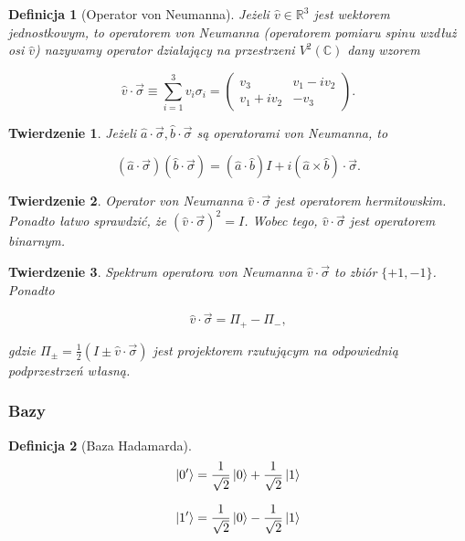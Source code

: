 \documentclass[a4paper,12pt]{article}
\newtheorem{definition}{Definicja}
\newtheorem{theorem}{Twierdzenie}
\begin{document}
\begin{definition}[Operator von Neumanna]
    Jeżeli $\hat{v} \in \mathbb{R} ^ 3$ jest wektorem jednostkowym, to operatorem von Neumanna (operatorem pomiaru spinu wzdłuż osi $\hat{v}$) nazywamy operator działający na przestrzeni $V ^ {2} (\mathbb{C})$ dany wzorem

    $$
        \hat{v} \cdot \vec{\sigma} \equiv \sum\limits_{i = 1} ^ {3} v_{i} \sigma_{i} =
        \begin{pmatrix}
            v_3 & v_{1} - i v_{2} \\
            v_{1} + i v_{2} & -v_3
        \end{pmatrix}.
    $$
\end{definition}

\begin{theorem}
    Jeżeli $\hat{a} \cdot \vec{\sigma}, \hat{b} \cdot \vec{\sigma}$ są operatorami von Neumanna, to

    $$
        (\hat{a} \cdot \vec{\sigma}) (\hat{b} \cdot \vec{\sigma}) = \left(\hat{a} \cdot \hat{b} \right) I + i \left(\hat{a} \times \hat{b}\right) \cdot \vec{\sigma}.
    $$
\end{theorem}

\begin{theorem}
    Operator von Neumanna $\hat{v} \cdot \vec{\sigma}$ jest operatorem hermitowskim. Ponadto łatwo sprawdzić, że $\left(\hat{v} \cdot \vec{\sigma}\right) ^ 2 = I$. Wobec tego, $\hat{v} \cdot \vec{\sigma}$ jest operatorem binarnym.
\end{theorem}

\begin{theorem}
    Spektrum operatora von Neumanna $\hat{v} \cdot \vec{\sigma}$ to zbiór $\{+1, -1\}$. Ponadto

    $$
    \hat{v} \cdot \vec{\sigma} = \Pi_{+} - \Pi_{-},
    $$

    gdzie $\Pi_{\pm} = \frac{1}{2} (I \pm \hat{v} \cdot \vec{\sigma})$ jest projektorem rzutującym na odpowiednią podprzestrzeń własną.
\end{theorem}

\subsubsection{Bazy}

\begin{definition}[Baza Hadamarda]
    $$
        \ket{0'} = \frac{1}{\sqrt{2}} \ket{0} + \frac{1}{\sqrt{2}} \ket{1}
    $$

    $$
        \ket{1'} = \frac{1}{\sqrt{2}} \ket{0} - \frac{1}{\sqrt{2}} \ket{1}
    $$
\end{definition}
\end{document}
